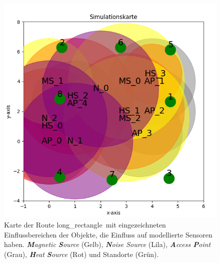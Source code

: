 \begin{figure}[h!]
    \centering
    \includegraphics[width=0.9\linewidth]{images/long_rectangle_simulation_map.png}
    \caption{Karte der Route \glqq long\_rectangle\grqq\ mit eingezeichneten Einflussbereichen der Objekte, die Einfluss auf modellierte Sensoren haben.
    \textit{\textbf{M}agnetic \textbf{S}ource} (Gelb), \textit{\textbf{N}oise Source} (Lila), \textit{\textbf{A}ccess \textbf{P}oint} (Grau),
    \textit{\textbf{H}eat \textbf{S}ource} (Rot) und Standorte (Grün).}
    \label{fig:long_rectangle_simulation_map}
\end{figure}

